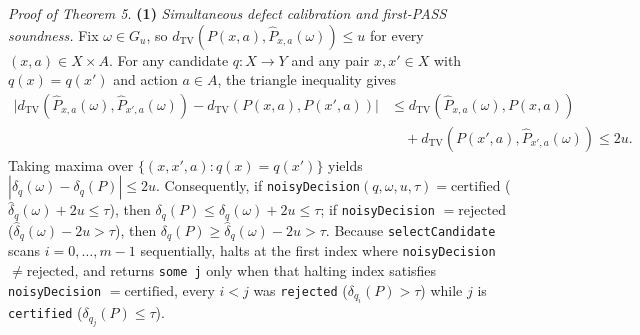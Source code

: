 \documentclass[11pt,a4paper]{article}
\begin{document}
\emph{Proof of Theorem 5.} \textbf{(1)} \emph{Simultaneous defect
calibration and first-PASS soundness.} Fix \(\omega \in G_u\), so
\(d_{\mathrm{TV}}(P(x,a), \widehat{P}_{x,a}(\omega)) \le u\) for every
\((x,a) \in X \times A\). For any candidate \(q: X \to Y\) and any pair
\(x, x' \in X\) with \(q(x) = q(x')\) and action \(a \in A\), the
triangle inequality gives \[\begin{aligned}
\bigl|d_{\mathrm{TV}}(\widehat{P}_{x,a}(\omega), \widehat{P}_{x',a}(\omega)) - d_{\mathrm{TV}}(P(x,a), P(x',a))\bigr|
&\le d_{\mathrm{TV}}(\widehat{P}_{x,a}(\omega), P(x,a)) \\
&\quad + d_{\mathrm{TV}}(P(x',a), \widehat{P}_{x',a}(\omega)) \le 2u.
\end{aligned}\] Taking maxima over \(\{(x, x', a) : q(x) = q(x')\}\)
yields \(|\widehat{\delta}_q(\omega) - \delta_q(P)| \le 2u\).
Consequently, if
\texttt{noisyDecision}\((q, \omega, u, \tau) = \mathrm{certified}\)
(\(\widehat{\delta}_q(\omega) + 2u \le \tau\)), then
\(\delta_q(P) \le \widehat{\delta}_q(\omega) + 2u \le \tau\); if
\texttt{noisyDecision} \(= \mathrm{rejected}\)
(\(\widehat{\delta}_q(\omega) - 2u > \tau\)), then
\(\delta_q(P) \ge \widehat{\delta}_q(\omega) - 2u > \tau\). Because
\texttt{selectCandidate} scans \(i = 0, \dots, m-1\) sequentially, halts
at the first index where \texttt{noisyDecision}
\(\neq \mathrm{rejected}\), and returns \texttt{some\ j} only when that
halting index satisfies \texttt{noisyDecision} \(= \mathrm{certified}\),
every \(i < j\) was \texttt{rejected} (\(\delta_{q_i}(P) > \tau\)) while
\(j\) is \texttt{certified} (\(\delta_{q_j}(P) \le \tau\)).
\end{document}
